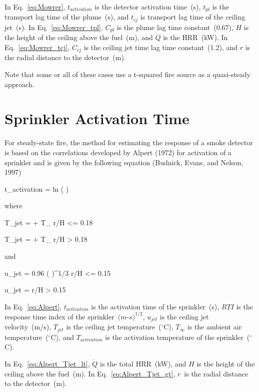 In Eq.~\ref{eq:Mowrer}, $t_{activation}$ is the detector activation time~(s), $t_{pl}$ is the transport lag time of the plume~(s), and $t_{cj}$ is transport lag time of the ceiling jet~(s). In Eq.~\ref{eq:Mowrer_tpl}, $C_{pl}$ is the plume lag time constant~(0.67), $H$ is the height of the ceiling above the fuel~(m), and $\dot Q$ is the HRR~(kW). In Eq.~\ref{eq:Mowrer_tcj}, $C_{cj}$ is the ceiling jet time lag time constant~(1.2), and $r$ is the radial distance to the detector~(m).

Note that some or all of these cases use a t-squared fire source as a quasi-steady approach.


\clearpage


\section{Sprinkler Activation Time}

For steady-state fire, the method for estimating the response of a smoke detector is based on the correlations developed by Alpert (1972) for activation of a sprinkler and is given by the following equation (Budnick, Evans, and Nelson, 1997)

\be
t_{activation} =   ln \left(  \right)\label{eq:Alpert}
\ee

\noindent where

\be
T_{jet} =  + T_\infty {} r/H <= 0.18
\label{eq:Alpert_Tjet_lt}
\ee

\be
T_{jet} =  + T_\infty {} r/H > 0.18
\label{eq:Alpert_Tjet_gt}
\ee

\noindent and

\be
u_{jet} = 0.96 \left(  \right)^{1/3}  r/H <= 0.15
\label{eq:Alpert_ujet_lt}
\ee

\be
u_{jet} =   r/H > 0.15
\label{eq:Alpert_ujet_gt}
\ee

In Eq.~\ref{eq:Alpert}, $t_{activation}$ is the activation time of the sprinkler~(s), $RTI$ is the response time index of the sprinkler~$(m$-$s)^{1/2}$, $u_{jet}$ is the ceiling jet velocity~(m/s), $T_{jet}$ is the ceiling jet temperature~($^\circ$C), $T_\infty$ is the ambient air temperature~($^\circ$C), and $T_{activation}$ is the activation temperature of the sprinkler~($^\circ$C).

In Eq.~\ref{eq:Alpert_Tjet_lt}, $\dot Q$ is the total HRR~(kW), and $H$ is the height of the ceiling above the fuel~(m). In Eq.~\ref{eq:Alpert_Tjet_gt}, $r$~is the radial distance to the detector~(m).


